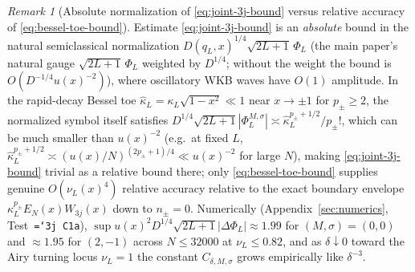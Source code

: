 \documentclass[11pt]{article}
\theoremstyle{definition}
\theoremstyle{remark}
\newtheorem{remark}[theorem]{Remark}
\renewcommand{\_}{\oldunderscore\penalty0\hskip0pt\relax}
\let\oldtexttt\texttt
\renewcommand{\texttt}[1]{\oldtexttt{\hyphenchar\font=`\-\relax #1}}
\begin{document}
\begin{remark}[Absolute normalization of \eqref{eq:joint-3j-bound} versus relative accuracy of \eqref{eq:bessel-toe-bound}]
\label{rem:abs-vs-rel}
Estimate \eqref{eq:joint-3j-bound} is an \emph{absolute} bound in the natural semiclassical normalization
  $D(q_L,x)^{1/4}\sqrt{2L+1}\,\Phi_L$ (the main paper's natural gauge $\sqrt{2L+1}\,\Phi_L$ weighted by $D^{1/4}$; without the weight the bound is $O(D^{-1/4}u(x)^{-2})$), where oscillatory WKB waves have $O(1)$ amplitude. In the rapid-decay Bessel toe
  $\hat{\kappa}_L=\kappa_L\sqrt{1-x^2}\ll 1$ near $x\to\pm 1$ for $p_\pm\ge 2$, the normalized symbol itself satisfies
  $D^{1/4}\sqrt{2L+1}|\Phi_L^{M,\sigma}|\asymp\hat{\kappa}_L^{p_\pm+1/2}/p_\pm!$, which can be much smaller than $u(x)^{-2}$
  (e.g.\ at fixed $L$, $\hat{\kappa}_L^{p_\pm+1/2}\asymp(u(x)/N)^{(2p_\pm+1)/4}\ll u(x)^{-2}$ for large $N$), making
  \eqref{eq:joint-3j-bound} trivial as a relative bound there; only \eqref{eq:bessel-toe-bound} supplies genuine $O(\nu_L(x)^4)$
  relative accuracy relative to the exact boundary envelope $\kappa_L^{p_\pm}E_N(x)W_{3j}(x)$ down to $n_\pm=0$. Numerically
  (Appendix~\ref{sec:numerics}, Test~\texttt{3j~C1a}), $\sup u(x)^2 D^{1/4}\sqrt{2L+1}|\Delta\Phi_L|\approx 1.99$ for
  $(M,\sigma)=(0,0)$ and $\approx 1.95$ for $(2,-1)$ across $N\le 32000$ at $\nu_L\le 0.82$, and as $\delta\downarrow 0$ toward
  the Airy turning locus $\nu_L=1$ the constant $C_{\delta,M,\sigma}$ grows empirically like $\delta^{-3}$.
\end{remark}
\end{document}
